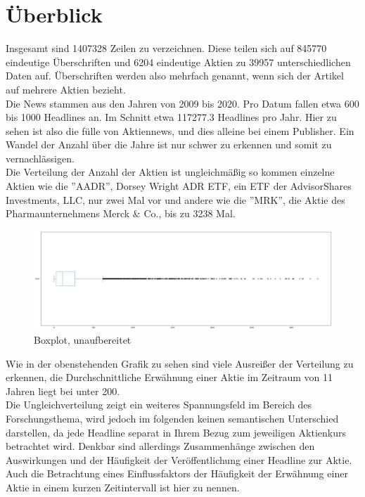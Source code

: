 \section*{Überblick}
Insgesamt sind 1407328 Zeilen zu verzeichnen. Diese teilen sich auf 845770 eindeutige Überschriften und 6204 eindeutige Aktien zu 39957 unterschiedlichen Daten auf. Überschriften werden also mehrfach genannt, wenn sich der Artikel auf mehrere Aktien bezieht.\\
Die News stammen aus den Jahren von 2009 bis 2020. Pro Datum fallen etwa 600 bis 1000 Headlines an. Im Schnitt etwa 117277.3 Headlines pro Jahr. Hier zu sehen ist also die fülle von Aktiennews, und dies alleine bei einem Publisher. Ein Wandel der Anzahl über die Jahre ist nur schwer zu erkennen und somit zu vernachlässigen. \\
Die Verteilung der Anzahl der Aktien ist ungleichmäßig so kommen einzelne Aktien wie die ''AADR'', Dorsey Wright ADR ETF, ein ETF der AdvisorShares Investments, LLC, nur zwei Mal vor und andere wie die ''MRK'', die Aktie des Pharmaunternehmens Merck \& Co., bis zu 3238 Mal. \\
\begin{figure}[t]
    \includegraphics[scale=0.25]{img/StockAllocation.png}
    \caption{Boxplot, unaufbereitet}
\end{figure}
Wie in der obenstehenden Grafik zu sehen sind viele Ausreißer der Verteilung zu erkennen, die Durchschnittliche Erwähnung einer Aktie im Zeitraum von 11 Jahren liegt bei unter 200.\\
Die Ungleichverteilung zeigt ein weiteres Spannungsfeld im Bereich des Forschungsthema, wird jedoch im folgenden keinen semantischen Unterschied darstellen, da jede Headline separat in Ihrem Bezug zum jeweiligen Aktienkurs betrachtet wird. Denkbar sind allerdings Zusammenhänge zwischen den Auswirkungen und der Häufigkeit der Veröffentlichung einer Headline zur Aktie. Auch die Betrachtung eines Einflussfaktors der Häufigkeit der Erwähnung einer Aktie in einem kurzen Zeitintervall ist hier zu nennen. \\ \\

